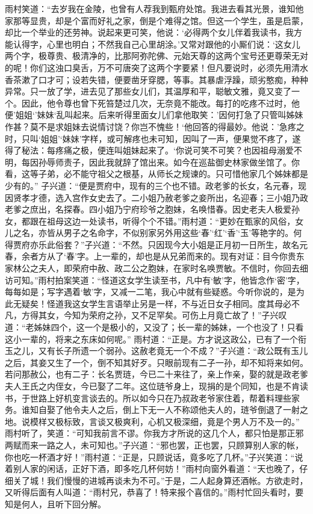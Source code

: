 \documentclass[12pt,oneside]{book}
\begin{document}
雨村笑道：“去岁我在金陵，也曾有人荐我到甄府处馆。我进去看其光景，谁知他家那等显贵，却是个富而好礼之家，倒是个难得之馆。但这一个学生，虽是启蒙，却比一个举业的还劳神。说起来更可笑，他说：‘必得两个女儿伴着我读书，我方能认得字，心里也明白；不然我自己心里胡涂。’又常对跟他的小厮们说：‘这女儿两个字，极尊贵、极清净的，比那阿弥陀佛、元始天尊的这两个宝号还更尊荣无对的呢！你们这浊口臭舌，万不可唐突了这两个字要紧！但凡要说时，必须先用清水香茶漱了口才可；设若失错，便要凿牙穿腮，等事。其暴虐浮躁，顽劣憨痴，种种异常。只一放了学，进去见了那些女儿们，其温厚和平，聪敏文雅，竟又变了一个。因此，他令尊也曾下死笞楚过几次，无奈竟不能改。每打的吃疼不过时，他便’姐姐‘’妹妹‘乱叫起来。后来听得里面女儿们拿他取笑：’因何打急了只管叫姊妹作甚？莫不是求姐妹去说情讨饶？你岂不愧些！‘他回答的得最妙。他说：’急疼之时，只叫‘姐姐’‘妹妹’字样，或可解疼也未可知，因叫了一声，便果觉不疼了，遂得了秘法：每疼痛之极，便连叫姐妹起来了。‘你说可笑不可笑？也因祖母溺爱不明，每因孙辱师责子，因此我就辞了馆出来。如今在巡盐御史林家做坐馆了。你看，这等子弟，必不能守祖父之根基，从师长之规谏的。只可惜他家几个姊妹都是少有的。”
子兴道：“便是贾府中，现有的三个也不错。政老爹的长女，名元春，现因贤孝才德，选入宫作女史去了。二小姐乃赦老爹之妾所出，名迎春；三小姐乃政老爹之庶出，名探春。四小姐乃宁府珍爷之胞妹，名唤惜春。因史老夫人极爱孙女，都跟在祖母这边一处读书，听得个个不错。”雨村道：“更妙在甄家的风俗，女儿之名，亦皆从男子之名命字，不似别家另外用这些‘春’‘红’‘香’‘玉’等艳字的。何得贾府亦乐此俗套？”子兴道：“不然。只因现今大小姐是正月初一日所生，故名元春，余者方从了‘春’字。上一辈的，却也是从兄弟而来的。现有对证：目今你贵东家林公之夫人，即荣府中赦、政二公之胞妹，在家时名唤贾敏。不信时，你回去细访可知。”雨村拍案笑道：“怪道这女学生读至书，凡中有‘敏’字，他皆念作‘密’字，每每如是；写字遇着‘敏’字，又减一二笔，我心中就有些疑惑。今听你说的，是为此无疑矣！怪道我这女学生言语举止另是一样，不与近日女子相同。度其母必不凡，方得其女，今知为荣府之孙，又不足罕矣。可伤上月竟亡故了！”子兴叹道：“老姊妹四个，这一个是极小的，又没了；长一辈的姊妹，一个也没了！只看这小一辈的，将来之东床如何呢。”
雨村道：“正是。方才说这政公，已有了一个衔玉之儿，又有长子所遗一个弱孙。这赦老竟无一个不成？”子兴道：“政公既有玉儿之后，其妾又生了一个，倒不知其好歹。只眼前现有二子一孙，却不知将来如何。若问那赦公，也有二子：长名贾琏，今已二十来往了，亲上作亲，娶的就是政老爹夫人王氏之内侄女，今已娶了二年。这位琏爷身上，现捐的是个同知，也是不肯读书，于世路上好机变言谈去的。所以如今只在乃叔政老爷家住着，帮着料理些家务。谁知自娶了他令夫人之后，倒上下无一人不称颂他夫人的，琏爷倒退了一射之地。说模样又极标致，言谈又极爽利，心机又极深细，竟是个男人万不及一的。”
雨村听了，笑道：“可知我前言不谬。你我方才所说的这几个人，都只怕是那正邪两赋而来一路之人，未可知也。”子兴道：“邪也罢，正也罢，只顾算别人家的帐，你也吃一杯酒才好！”雨村道：“正是，只顾说话，竟多吃了几杯。”子兴笑道：“说着别人家的闲话，正好下酒，即多吃几杯何妨！”雨村向窗外看道：“天也晚了，仔细关了城！我们慢慢的进城再谈未为不可。”于是，二人起身算还酒帐。方欲走时，又听得后面有人叫道：“雨村兄，恭喜了！特来报个喜信的。”雨村忙回头看时，要知是何人，且听下回分解。
\end{document}
